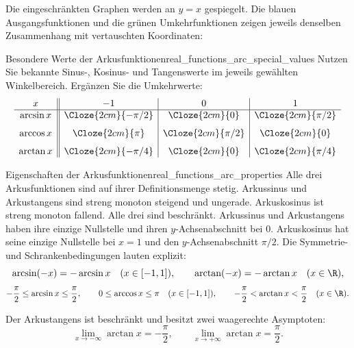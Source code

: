 Die eingeschränkten Graphen werden an $y=x$ gespiegelt.
Die blauen Ausgangsfunktionen und die grünen Umkehrfunktionen zeigen
jeweils denselben Zusammenhang mit vertauschten Koordinaten:
\begin{center}
\end{center}
\begin{ExampleBox}{Besondere Werte der Arkusfunktionen}{real_functions_arc_special_values}
  Nutzen Sie bekannte Sinus-, Kosinus- und Tangenswerte im jeweils
  gewählten Winkelbereich. Ergänzen Sie die Umkehrwerte:
  \[
    \begin{array}{c||c|c|c}
      x&-1&0&1\\\hline
      \arcsin x&\Cloze{2cm}{-\pi/2}&\Cloze{2cm}{0}&\Cloze{2cm}{\pi/2}\\[0.7em]
      \arccos x&\Cloze{2cm}{\pi}&\Cloze{2cm}{\pi/2}&\Cloze{2cm}{0}\\[0.7em]
      \arctan x&\Cloze{2cm}{-\pi/4}&\Cloze{2cm}{0}&\Cloze{2cm}{\pi/4}
    \end{array}
  \]
\end{ExampleBox}

\begin{center}
\end{center}
\begin{TheoremBox}{Eigenschaften der Arkusfunktionen}{real_functions_arc_properties}
  Alle drei Arkusfunktionen sind auf ihrer Definitionsmenge stetig.
  Arkussinus und Arkustangens sind streng monoton steigend und ungerade.
  Arkuskosinus ist streng monoton fallend.
  Alle drei sind beschränkt. Arkussinus und Arkustangens haben ihre
  einzige Nullstelle und ihren $y$-Achsenabschnitt bei $0$.
  Arkuskosinus hat seine einzige Nullstelle bei $x=1$ und den
  $y$-Achsenabschnitt $\pi/2$.
  Die Symmetrie- und Schrankenbedingungen lauten explizit:
  \[
    \arcsin(-x)=-\arcsin x\quad(x\in[-1,1]),\qquad
    \arctan(-x)=-\arctan x\quad(x\in\R),
  \]
  \[
    -\frac\pi2\le\arcsin x\le\frac\pi2,\qquad
    0\le\arccos x\le\pi\quad(x\in[-1,1]),\qquad
    -\frac\pi2<\arctan x<\frac\pi2\quad(x\in\R).
  \]

  Der Arkustangens ist beschränkt und besitzt zwei waagerechte Asymptoten:
  \[
    \lim_{x\to-\infty}\arctan x=-\frac\pi2,\qquad
    \lim_{x\to+\infty}\arctan x=\frac\pi2.
  \]
\end{TheoremBox}

